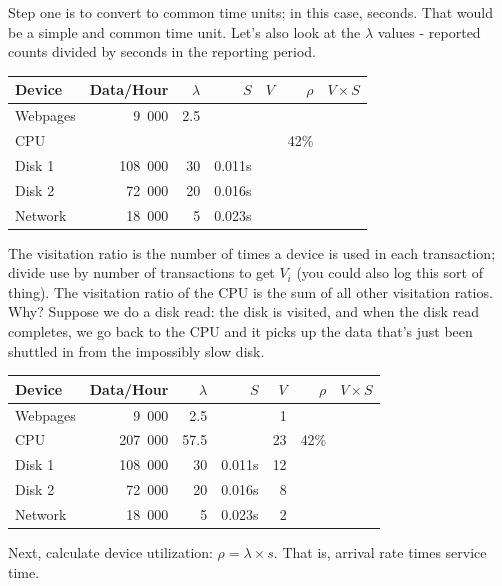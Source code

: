 \documentclass[a4paper]{report}
\begin{document}
Step one is to convert to common time units; in this case, seconds. That would be a simple and common time unit. Let's also look at the $\lambda$ values - reported counts divided by seconds in the reporting period.

\begin{center}
\begin{tabular}{l|r|r|r|r|r|r} 
	\textbf{Device} & \textbf{Data/Hour} & \textbf{$\lambda$} & \textbf{$S$} & \textbf{$V$} & \textbf{$\rho$} & \textbf{$V \times S$} \\ \hline
	Webpages & 9~000 & 2.5 & & & & \\ \hline
	CPU & & & & & 42\% & \\ \hline
	Disk 1 & 108~000 & 30 & 0.011s  & & &\\ \hline
	Disk 2 & 72~000 & 20 & 0.016s & & &\\ \hline
	Network & 18~000 & 5 & 0.023s & & &
\end{tabular}
\end{center}

The visitation ratio is the number of times a device is used in each transaction; divide use by number of transactions to get $V_{i}$ (you could also log this sort of thing). The visitation ratio of the CPU is the sum of all other visitation ratios. Why? Suppose we do a disk read: the disk is visited, and when the disk read completes, we go back to the CPU and it picks up the data that's just been shuttled in from the impossibly slow disk.

\begin{center}
\begin{tabular}{l|r|r|r|r|r|r} 
	\textbf{Device} & \textbf{Data/Hour} & \textbf{$\lambda$} & \textbf{$S$} & \textbf{$V$} & \textbf{$\rho$} & \textbf{$V \times S$} \\ \hline
	Webpages & 9~000 & 2.5 & & 1 & & \\ \hline
	CPU & 207~000 & 57.5 &  & 23 & 42\% & \\ \hline
	Disk 1 & 108~000 & 30 & 0.011s  & 12& &\\ \hline
	Disk 2 & 72~000 & 20 & 0.016s & 8 & &\\ \hline
	Network & 18~000 & 5 & 0.023s & 2 & &
\end{tabular}
\end{center}

Next, calculate device utilization: $\rho = \lambda \times s$. That is, arrival rate times service time.
\end{document}
